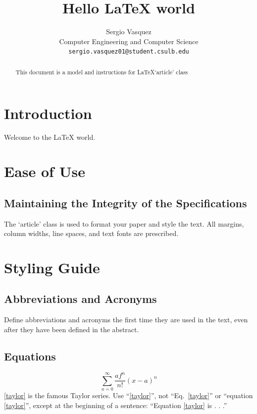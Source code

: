 \documentclass{article}
\begin{document}
\title{Hello \LaTeX\xspace world}

\author{Sergio Vasquez\\
\small{Computer Engineering and Computer Science}\\
\small{\texttt{sergio.vasquez01@student.csulb.edu}}}
\date{}
\maketitle

\begin{abstract}
This document is a model and instructions for \LaTeX\xspace `article' class
\end{abstract}

\section{Introduction}
Welcome to the \LaTeX\xspace world.
\section{Ease of Use}

\subsection{Maintaining the Integrity of the Specifications}
The `article' class is used to format your paper and style the text. All margins, column widths, line spaces, and text fonts are prescribed.

\section{Styling Guide}

\subsection{Abbreviations and Acronyms}
Define abbreviations and acronyms the first time they are used in the text, 
even after they have been defined in the abstract.

\subsection{Equations}
\begin{equation}
\sum_{n=0}^{\infty}\frac{af^{n}}{n!}(x-a)^n
\label{taylor}
\end{equation}
\eqref{taylor} is the famous Taylor series. Use ``\eqref{taylor}'', not ``Eq.~\eqref{taylor}'' or ``equation \eqref{taylor}'', except at the beginning of a sentence: ``Equation \eqref{taylor} is . . .''
\end{document}
